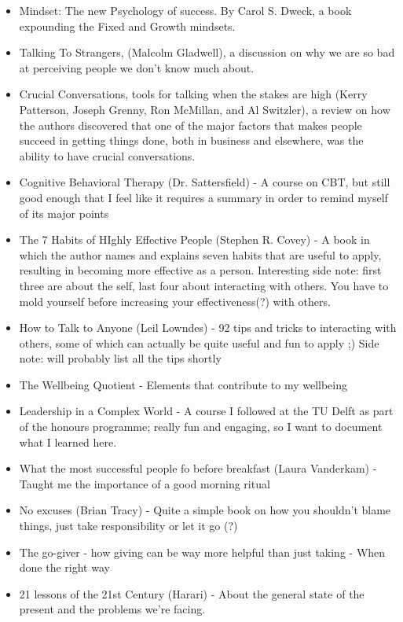 \documentclass[12pt,a4paper]{article}
\begin{document}
\begin{itemize}
\item Mindset: The new Psychology of success. By Carol S. Dweck, a book expounding the Fixed and Growth mindsets.
\item Talking To Strangers, (Malcolm Gladwell), a discussion on why we are so bad at perceiving people we don't know much about.
\item Crucial Conversations, tools for talking when the stakes are high (Kerry Patterson, Joseph Grenny, Ron McMillan, and Al Switzler), a review on how the authors discovered that one of the major factors that makes people succeed in getting things done, both in business and elsewhere, was the ability to have crucial conversations.
\item Cognitive Behavioral Therapy (Dr. Sattersfield) -  A course on CBT, but still good enough that I feel like it requires a summary in order to remind myself of its major points
\item The 7 Habits of HIghly Effective People (Stephen R. Covey) - A book in which the author names and explains seven habits that are useful to apply, resulting in becoming more effective as a person. Interesting side note: first three are about the self, last four about interacting with others. You have to mold yourself before increasing your effectiveness(?) with others.
\item How to Talk to Anyone (Leil Lowndes) - 92 tips and tricks to interacting with others, some of which can actually be quite useful and fun to apply ;) Side note: will probably list all the tips shortly
\item The Wellbeing Quotient - Elements that contribute to my wellbeing
\item Leadership in a Complex World - A course I followed at the TU Delft as part of the honours programme; really fun and engaging, so I want to document what I learned here.
\item What the most successful people fo before breakfast (Laura Vanderkam) - Taught me the importance of a good morning ritual
\item No excuses  (Brian Tracy) - Quite a simple book on how you shouldn't blame things, just take responsibility or let it go (?)
\item The go-giver - how giving can be way more helpful than just taking - When done the right way
\item 21 lessons of the 21st Century (Harari) - About the general state of the present and the problems we're facing.

\end{itemize}
\end{document}
